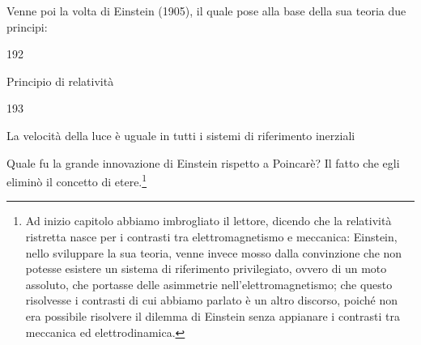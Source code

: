 Venne poi la volta di Einstein (1905), il quale pose alla base della
sua teoria due principi:
\begin{dinglist}{192}
\item Principio di relativit\`a
\end{dinglist}
\begin{dinglist}{193}
\item La velocit\`a della luce \`e uguale in tutti i sistemi di
  riferimento inerziali
\end{dinglist}
Quale fu la grande innovazione di Einstein rispetto a Poincar\`e?  Il
fatto che egli elimin\`o il concetto di etere.\footnote{Ad inizio
  capitolo abbiamo imbrogliato il lettore, dicendo che la relativit\`a
  ristretta nasce per i contrasti tra elettromagnetismo e meccanica:
  Einstein, nello sviluppare la sua teoria, venne invece mosso dalla
  convinzione che non potesse esistere un sistema di riferimento
  privilegiato, ovvero di un moto assoluto, che portasse delle
  asimmetrie nell'elettromagnetismo; che questo risolvesse i contrasti
  di cui abbiamo parlato \`e un altro discorso, poich\'e non era
  possibile risolvere il dilemma di Einstein senza appianare i
  contrasti tra meccanica ed elettrodinamica.}


